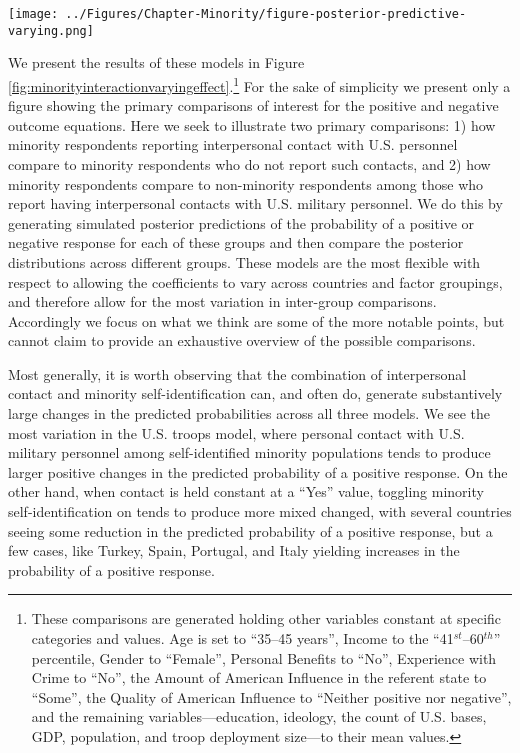 \begin{sidewaysfigure}[h!p]
	\centering\texttt{[image: ../Figures/Chapter-Minority/figure-posterior-predictive-varying.png]}
	\caption{Posterior predictive check for varying effect models. Darkened dots with credible intervals show the mean predicted count of the outcome categories based on 1,000 simulations from the model. Light blue vars show the actual count of each outcome category as observed in the data. Better fitting models should produce simulated values that are closer to the actual observed data.}
	\label{fig:minorityvaryingppcheck}
\end{sidewaysfigure}



We present the results of these models in Figure \ref{fig:minorityinteractionvaryingeffect}.\footnote{These comparisons are generated holding other variables constant at specific categories and values. Age is set to ``35--45 years'', Income to the ``41$^{st}$--60$^{th}$'' percentile, Gender to ``Female'', Personal Benefits to ``No'', Experience with Crime to ``No'', the Amount of American Influence in the referent state to ``Some'', the Quality of American Influence to ``Neither positive nor negative'', and the remaining variables---education, ideology, the count of U.S. bases, GDP, population, and troop deployment size---to their mean values.} For the sake of simplicity we present only a figure showing the primary comparisons of interest for the positive and negative outcome equations. Here we seek to illustrate two primary comparisons: 1) how minority respondents reporting interpersonal contact with U.S. personnel compare to minority respondents who do not report such contacts, and 2) how minority respondents compare to non-minority respondents among those who report having interpersonal contacts with U.S. military personnel. We do this by generating simulated posterior predictions of the probability of a positive or negative response for each of these groups and then compare the posterior distributions across different groups. These models are the most flexible with respect to allowing the coefficients to vary across countries and factor groupings, and therefore allow for the most variation in inter-group comparisons. Accordingly we focus on what we think are some of the more notable points, but cannot claim to provide an exhaustive overview of the possible comparisons.

Most generally, it is worth observing that the combination of interpersonal contact and minority self-identification can, and often do, generate substantively large changes in the predicted probabilities across all three models. We see the most variation in the U.S. troops model, where personal contact with U.S. military personnel among self-identified minority populations tends to produce larger positive changes in the predicted probability of a positive response. On the other hand, when contact is held constant at a ``Yes'' value, toggling minority self-identification on tends to produce more mixed changed, with several countries seeing some reduction in the predicted probability of a positive response, but a few cases, like Turkey, Spain, Portugal, and Italy yielding increases in the probability of a positive response. 


